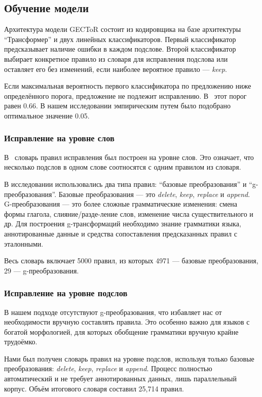 \subsection{Обучение модели}

Архитектура модели GECToR состоит из кодировщика на базе архитектуры “Трансформер” и двух линейных классификаторов. Первый классификатор предсказывает наличие ошибки в каждом подслове. Второй классификатор выбирает конкретное правило из словаря для исправления подслова или оставляет его без изменений, если наиболее вероятное правило --- \textit{keep}.

Если максимальная вероятность первого классификатора по предложению ниже определённого порога, предложение не подлежит исправлению. В~\cite{b15} этот порог равен 0.66. В нашем исследовании эмпирическим путем было подобрано оптимальное значение 0.05.

\subsubsection{Исправление на уровне слов}

В~\cite{b15} словарь правил исправления был построен на уровне слов. Это означает, что несколько подслов в одном слове соотносятся с одним правилом из словаря.

В исследовании использовались два типа правил: “базовые преобразования” и “g-преобразования”. Базовые преобразования — это \textit{delete}, \textit{keep}, \textit{replace} и \textit{append}. G-преобразования --- это более сложные грамматические изменения: смена формы глагола, слияние/разде-ление слов, изменение числа существительного и др. Для построения g-трансформаций необходимо знание грамматики языка, аннотированные данные и средства сопоставления предсказанных правил с эталонными.

Весь словарь включает 5000 правил, из которых 4971 --- базовые преобразования, 29 --- g-преобразования.

\subsubsection{Исправление на уровне подслов}

В нашем подходе отсутствуют g-преобразования, что избавляет нас от необходимости вручную составлять правила. Это особенно важно для языков с богатой морфологией, для которых обобщение грамматики вручную крайне трудоёмко.

Нами был получен словарь правил на уровне подслов, используя только базовые преобразования: \textit{delete}, \textit{keep}, \textit{replace} и \textit{append}. Процесс полностью автоматический и не требует аннотированных данных, лишь параллельный корпус. Объём итогового словаря составил 25,714 правил.

